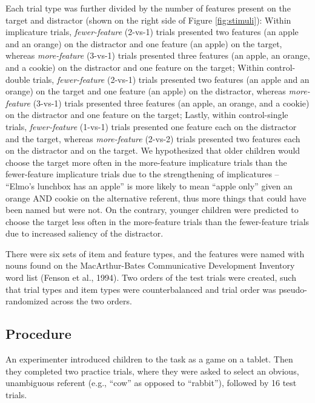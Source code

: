 \documentclass[man]{apa6}
\theoremstyle{definition}
\theoremstyle{definition}
\theoremstyle{definition}
\theoremstyle{remark}
\begin{document}
Each trial type was further divided by the number of features present on
the target and distractor (shown on the right side of Figure
\ref{fig:stimuli}): Within implicature trials, \emph{fewer-feature}
(2-vs-1) trials presented two features (an apple and an orange) on the
distractor and one feature (an apple) on the target, whereas
\emph{more-feature} (3-vs-1) trials presented three features (an apple,
an orange, and a cookie) on the distractor and one feature on the
target; Within control-double trials, \emph{fewer-feature} (2-vs-1)
trials presented two features (an apple and an orange) on the target and
one feature (an apple) on the distractor, whereas \emph{more-feature}
(3-vs-1) trials presented three features (an apple, an orange, and a
cookie) on the distractor and one feature on the target; Lastly, within
control-single trials, \emph{fewer-feature} (1-vs-1) trials presented
one feature each on the distractor and the target, whereas
\emph{more-feature} (2-vs-2) trials presented two features each on the
distractor and on the target. We hypothesized that older children would
choose the target more often in the more-feature implicature trials than
the fewer-feature implicature trials due to the strengthening of
implicatures -- \enquote{Elmo's lunchbox has an apple} is more likely to
mean \enquote{apple only} given an orange AND cookie on the alternative
referent, thus more things that could have been named but were not. On
the contrary, younger children were predicted to choose the target less
often in the more-feature trials than the fewer-feature trials due to
increased saliency of the distractor.

There were six sets of item and feature types, and the features were
named with nouns found on the MacArthur-Bates Communicative Development
Inventory word list (Fenson et al., 1994). Two orders of the test trials
were created, such that trial types and item types were counterbalanced
and trial order was pseudo-randomized across the two orders.

\subsection{Procedure}\label{procedure}

An experimenter introduced children to the task as a game on a tablet.
Then they completed two practice trials, where they were asked to select
an obvious, unambiguous referent (e.g., \enquote{cow} as opposed to
\enquote{rabbit}), followed by 16 test trials.
\end{document}
